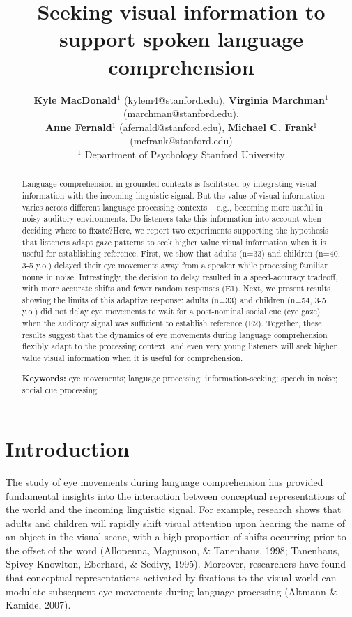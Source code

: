 \documentclass[10pt, letterpaper]{article}
\title{Seeking visual information to support spoken language comprehension}
\author{ {\large \bf Kyle MacDonald}$^1$ (kylem4@stanford.edu), {\large \bf Virginia Marchman}$^1$ (marchman@stanford.edu),  \\ {\large \bf Anne Fernald}$^1$ (afernald@stanford.edu), {\large \bf Michael C. Frank}$^1$ (mcfrank@stanford.edu) 
  \\ $^1$ Department of Psychology Stanford University}
\begin{document}
\maketitle

\begin{abstract}
Language comprehension in grounded contexts is facilitated by
integrating visual information with the incoming linguistic signal. But
the value of visual information varies across different language
processing contexts -- e.g., becoming more useful in noisy auditory
environments. Do listeners take this information into account when
deciding where to fixate?Here, we report two experiments supporting the
hypothesis that listeners adapt gaze patterns to seek higher value
visual information when it is useful for establishing reference. First,
we show that adults (n=33) and children (n=40, 3-5 y.o.) delayed their
eye movements away from a speaker while processing familiar nouns in
noise. Intrestingly, the decision to delay resulted in a speed-accuracy
tradeoff, with more accurate shifts and fewer random responses (E1).
Next, we present results showing the limits of this adaptive response:
adults (n=33) and children (n=54, 3-5 y.o.) did not delay eye movements
to wait for a post-nominal social cue (eye gaze) when the auditory
signal was sufficient to establish reference (E2). Together, these
results suggest that the dynamics of eye movements during language
comprehension flexibly adapt to the processing context, and even very
young listeners will seek higher value visual information when it is
useful for comprehension.

\textbf{Keywords:}
eye movements; language processing; information-seeking; speech in
noise; social cue processing
\end{abstract}

\section{Introduction}\label{introduction}

The study of eye movements during language comprehension has provided
fundamental insights into the interaction between conceptual
representations of the world and the incoming linguistic signal. For
example, research shows that adults and children will rapidly shift
visual attention upon hearing the name of an object in the visual scene,
with a high proportion of shifts occurring prior to the offset of the
word (Allopenna, Magnuson, \& Tanenhaus, 1998; Tanenhaus,
Spivey-Knowlton, Eberhard, \& Sedivy, 1995). Moreover, researchers have
found that conceptual representations activated by fixations to the
visual world can modulate subsequent eye movements during language
processing (Altmann \& Kamide, 2007).
\end{document}

